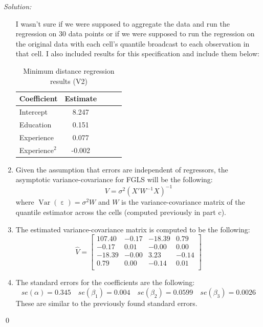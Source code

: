 \documentclass[12pt]{article}
\DeclareMathOperator*{\Var}{\text{Var}}
\DeclareMathOperator{\eps}{\varepsilon}
\newenvironment{problem}[2][Problem]{\begin{trivlist}
\item[\hskip \labelsep {\bfseries #1}\hskip \labelsep {\bfseries #2.}]}{\end{trivlist}}
\newenvironment{sol}
    {\emph{Solution:}
    }
    {
    \qed
    }
\begin{document}
\begin{sol}
\begin{enumerate}[label=\alph*) ]
  I wasn't sure if we were supposed to aggregate the data and run the regression on 30 data points or if we were supposed to run the regression on the original data with each cell's quantile broadcast to each observation in that cell. I also included results for this specification and include them below:
  \begin{table}[htbp]
    \centering
    \caption{Minimum distance regression results (V2)}
      \begin{tabular}{lcccc}
          \toprule
            Coefficient          & Estimate          \\
          \midrule
          Intercept & 8.247  \\
          Education & 0.151 \\
          Experience & 0.077 \\
          Experience$^2$ & -0.002  \\
          \bottomrule
      \end{tabular}
    \label{tab:mdreg2}
  \end{table}
  \item Given the assumption that errors are independent of regressors, the asymptotic variance-covariance for FGLS will be the following:
  \[V = \sigma^2 (X' W^{-1} X)^{-1}\]
  where $\Var(\eps) = \sigma^2 W$ and $W$ is the variance-covariance matrix of the quantile estimator across the cells (computed previously in part c).
  \item The estimated variance-covariance matrix is computed to be the following:
  \[\hat{V} = \begin{bmatrix}
    107.40 & -0.17 & -18.39 & 0.79 \\ 
    -0.17 & 0.01 & -0.00 & 0.00 \\ 
    -18.39 & -0.00 & 3.23 & -0.14 \\ 
    0.79 & 0.00 & -0.14 & 0.01 \\ 
    \end{bmatrix}\]
  \item The standard errors for the coefficients are the following:
  \[se(\alpha) = 0.345 \quad se(\beta_1) = 0.004 \quad se(\beta_2) = 0.0599 \quad se(\beta_3 ) = 0.0026\]
  These are similar to the previously found standard errors.
\end{enumerate}
\end{sol}
\begin{problem}{4}
\end{problem}
\end{document}
